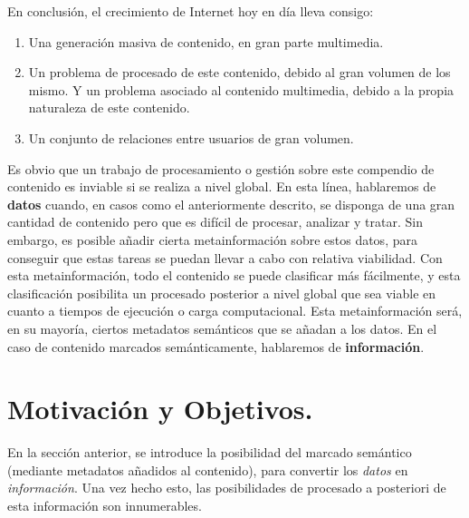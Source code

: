En conclusión, el crecimiento de Internet hoy en día lleva consigo:
\begin{enumerate}
	\item Una generación masiva de contenido, en gran parte multimedia.
	\item Un problema de procesado de este contenido, debido al gran volumen de los mismo. Y un problema asociado al contenido multimedia, debido a la propia naturaleza de este contenido.
	\item Un conjunto de relaciones entre usuarios de gran volumen.
\end{enumerate}

Es obvio que un trabajo de procesamiento o gestión sobre este compendio de contenido es inviable si se realiza a nivel global. En esta línea, hablaremos de {\bf datos} cuando, en casos como el anteriormente descrito, se disponga de una gran cantidad de contenido pero que es difícil de procesar, analizar y tratar. Sin embargo, es posible añadir cierta metainformación sobre estos datos, para conseguir que estas tareas se puedan llevar a cabo con relativa viabilidad. Con esta metainformación, todo el contenido se puede clasificar más fácilmente, y esta clasificación posibilita un procesado posterior a nivel global que sea viable en cuanto a tiempos de ejecución o carga computacional. Esta metainformación será, en su mayoría, ciertos metadatos semánticos que se añadan a los datos. En el caso de contenido marcados semánticamente, hablaremos de {\bf información}.






\section*{Motivación y Objetivos.}

En la sección anterior, se introduce la posibilidad del marcado semántico (mediante metadatos añadidos al contenido), para convertir los \emph{datos} en \emph{información}. Una vez hecho esto, las posibilidades de procesado a posteriori de esta información son innumerables.

